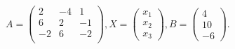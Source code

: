 \documentclass[12pt]{article}
\begin{document}
$ \begin{equation*}A=\begin{pmatrix}2 & -4 & 1 \\6 & 2 & -1 \\-2 & 6 & -2 \\\end{pmatrix}, X=\begin{pmatrix}x_1 \\x_2 \\x_3\end{pmatrix}, B = \begin{pmatrix}4 \\10 \\-6\end{pmatrix}.\end{equation*} $
\end{document}
